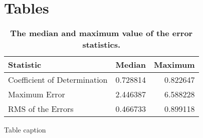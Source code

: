 \documentclass[10pt]{article}
\begin{document}
\section*{Tables}

\begin{table}[!ht]
  \caption{{\bf The median and maximum value of the error statistics.}}
  \centering
  \begin{tabular}{lrr}
    \hline
    Statistic                    & Median   & Maximum \\
    \hline
    Coefficient of Determination & 0.728814 & 0.822647 \\
    Maximum Error                & 2.446387 & 6.588228 \\
    RMS of the Errors            & 0.466733 & 0.899118
  \end{tabular}
  \begin{flushleft}
    Table caption
  \end{flushleft}
  \label{tab:medians}
\end{table}
\end{document}
